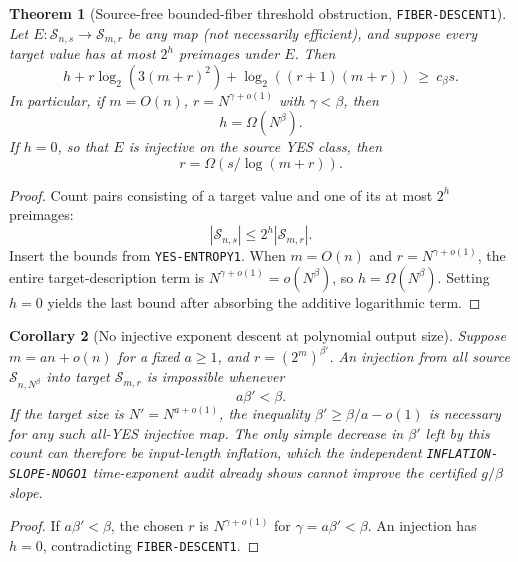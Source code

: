 \documentclass[11pt]{article}
\newtheorem{theorem}{Theorem}
\newtheorem{corollary}[theorem]{Corollary}
\begin{document}
\begin{theorem}[Source-free bounded-fiber threshold obstruction,
\texttt{FIBER-DESCENT1}]
Let \(E:\mathcal S_{n,s}\to\mathcal S_{m,r}\) be any map
(not necessarily efficient), and suppose every target value
has at most \(2^h\) preimages under \(E\).
Then
\[
\boxed{
h+r\log_2(3(m+r)^2)+\log_2((r+1)(m+r))
\ \ge\ c_\beta s.
}
\]
In particular, if \(m=O(n)\), \(r=N^{\gamma+o(1)}\)
with \(\gamma<\beta\), then
\[
   \boxed{h=\Omega(N^\beta).}
\]
If \(h=0\), so that \(E\) is injective on the
source YES class, then
\[
  \boxed{r=\Omega(s/\log(m+r)).}
\]
\end{theorem}
\begin{proof}
Count pairs consisting of a target value and one of its
at most \(2^h\) preimages:
\[
 |\mathcal S_{n,s}|
 \le 2^h|\mathcal S_{m,r}|.
\]
Insert the bounds from \texttt{YES-ENTROPY1}.
When \(m=O(n)\) and \(r=N^{\gamma+o(1)}\), the entire
target-description term is
\(N^{\gamma+o(1)}=o(N^\beta)\), so \(h=\Omega(N^\beta)\).
Setting \(h=0\) yields the last bound after absorbing
the additive logarithmic term.
\end{proof}

\begin{corollary}[No injective exponent descent at polynomial output size]
Suppose \(m=an+o(n)\) for a fixed \(a\ge1\), and
\(r=(2^m)^{\beta'}\).  An injection from all
source \(\mathcal S_{n,N^\beta}\) into target
\(\mathcal S_{m,r}\) is impossible whenever
\[
  \boxed{a\beta'<\beta.}
\]
If the target size is \(N'=N^{a+o(1)}\), the
inequality \(\beta'\ge\beta/a-o(1)\) is necessary
for any such all-YES injective map.  The only
simple decrease in \(\beta'\) left by this count
can therefore be input-length inflation, which
the independent \texttt{INFLATION-SLOPE-NOGO1}
time-exponent audit already shows cannot improve
the certified \(g/\beta\) slope.
\end{corollary}
\begin{proof}
If \(a\beta'<\beta\), the chosen \(r\) is
\(N^{\gamma+o(1)}\) for \(\gamma=a\beta'<\beta\).
An injection has \(h=0\), contradicting
\texttt{FIBER-DESCENT1}.
\end{proof}
\end{document}
